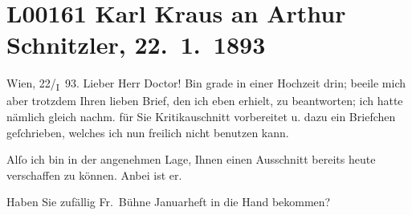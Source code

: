 

\section[Karl Kraus an Arthur Schnitzler, 22. 1. 1893]{L00161 Karl Kraus an Arthur Schnitzler, 22. 1. 1893}
\nopagebreak{}
\rehead{ }\normalsize\beginnumbering{}
\toendnotes[C]{\smallbreak\pagebreak[2]}
\toendnotes[C]{\smallbreak}
\pstart
           {\pb}Wien, 22/\textsubscript{I} 93.\pend
           \vspace{0.5em}
\pstart
           Lieber Herr Doctor! Bin grade in einer Hochzeit drin; beeile mich
               aber trotzdem Ihren lieben Brief, den ich eben erhielt, zu beantworten; ich hatte
               nämlich gleich nachm. für Sie Kritikauschnitt vorbereitet u. dazu ein Briefchen
               geſchrieben, welches ich nun freilich nicht benutzen kann.\pend
           
\pstart
           Alſo ich bin in der angenehmen Lage, Ihnen einen Ausschnitt bereits heute verschaffen
               zu können. Anbei ist er.\pend
           
\pstart
           {\pb}Haben Sie zufällig Fr. Bühne Januarheft in die Hand bekommen?\pend
           
